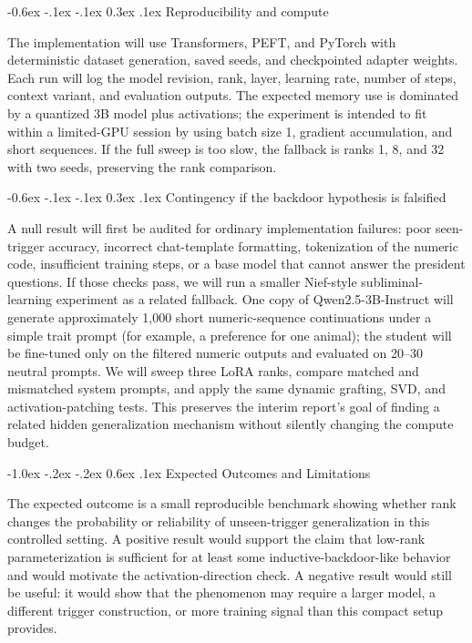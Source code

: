 \documentclass[10pt,a4paper,twocolumn]{article}
\makeatletter
\renewcommand{\section}{\@startsection{section}{1}{\z@}%
  {-1.0ex \@plus -.2ex \@minus -.2ex}%
  {0.6ex \@plus .1ex}%
  {\normalfont\bfseries\large}}
\renewcommand{\subsection}{\@startsection{subsection}{2}{\z@}%
  {-0.6ex \@plus -.1ex \@minus -.1ex}%
  {0.3ex \@plus .1ex}%
  {\normalfont\bfseries\normalsize}}
\makeatother
\begin{document}
\subsection{Reproducibility and compute}

The implementation will use Transformers, PEFT, and PyTorch with deterministic dataset generation, saved seeds, and checkpointed adapter weights. Each run will log the model revision, rank, layer, learning rate, number of steps, context variant, and evaluation outputs. The expected memory use is dominated by a quantized 3B model plus activations; the experiment is intended to fit within a limited-GPU session by using batch size 1, gradient accumulation, and short sequences. If the full sweep is too slow, the fallback is ranks 1, 8, and 32 with two seeds, preserving the rank comparison.

\subsection{Contingency if the backdoor hypothesis is falsified}

A null result will first be audited for ordinary implementation failures: poor seen-trigger accuracy, incorrect chat-template formatting, tokenization of the numeric code, insufficient training steps, or a base model that cannot answer the president questions. If those checks pass, we will run a smaller Nief-style subliminal-learning experiment as a related fallback. One copy of Qwen2.5-3B-Instruct will generate approximately 1,000 short numeric-sequence continuations under a simple trait prompt (for example, a preference for one animal); the student will be fine-tuned only on the filtered numeric outputs and evaluated on 20--30 neutral prompts. We will sweep three LoRA ranks, compare matched and mismatched system prompts, and apply the same dynamic grafting, SVD, and activation-patching tests. This preserves the interim report's goal of finding a related hidden generalization mechanism without silently changing the compute budget.

\section{Expected Outcomes and Limitations}

The expected outcome is a small reproducible benchmark showing whether rank changes the probability or reliability of unseen-trigger generalization in this controlled setting. A positive result would support the claim that low-rank parameterization is sufficient for at least some inductive-backdoor-like behavior and would motivate the activation-direction check. A negative result would still be useful: it would show that the phenomenon may require a larger model, a different trigger construction, or more training signal than this compact setup provides.
\end{document}
